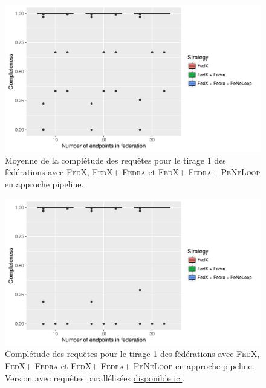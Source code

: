 \documentclass[a4paper]{article}
\def\fedra{\textsc{Fedra}\xspace}
\def\fedx{\textsc{FedX}\xspace}
\def\peneloop{\textsc{PeNeLoop}\xspace}
\newcommand{\parallelLink}[1]{Version avec requêtes parallélisées \href{#1}{disponible ici}.}
\begin{document}
\begin{figure}[h]
    \centering
    \includegraphics{boxplots/avg_completeness.pdf}
    \caption{Moyenne de la complétude des requêtes pour le tirage 1 des fédérations avec \fedx, \fedx + \fedra et \fedx + \fedra + \peneloop en approche pipeline.}
    \label{fig:avg_compl}
\end{figure}

\begin{figure}[h]
    \centering
    \includegraphics{boxplots/fed1_completeness.pdf}
    \caption{Complétude des requêtes pour le tirage 1 des fédérations avec \fedx, \fedx + \fedra et \fedx + \fedra + \peneloop en approche pipeline. \parallelLink{https://github.com/Callidon/ParallelNestedLoop/blob/master/results/definitive/fed1_pll_completeness.pdf}}
    \label{fig:fed1_compl}
\end{figure}
\end{document}
